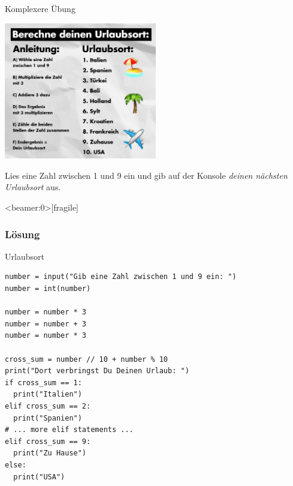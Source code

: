 \begin{frame}{Komplexere Übung}
\begin{center}
\includegraphics[width=0.5\textwidth]{urlaubsort.png}
\end{center}
Lies eine Zahl zwischen 1 und 9 ein und gib auf der Konsole \emph{deinen nächsten Urlaubsort} aus. 
\end{frame}


\begin{frame}<beamer:0>[fragile]
\frametitle{Lösung}
\begin{solutionblock}{Urlaubsort}
\begin{verbatim}
number = input("Gib eine Zahl zwischen 1 und 9 ein: ")
number = int(number)

number = number * 3
number = number + 3
number = number * 3

cross_sum = number // 10 + number % 10
print("Dort verbringst Du Deinen Urlaub: ")
if cross_sum == 1:
  print("Italien")
elif cross_sum == 2:
  print("Spanien")
# ... more elif statements ... 
elif cross_sum == 9:
  print("Zu Hause")
else:
  print("USA")
\end{verbatim}
\end{solutionblock}
\end{frame}



